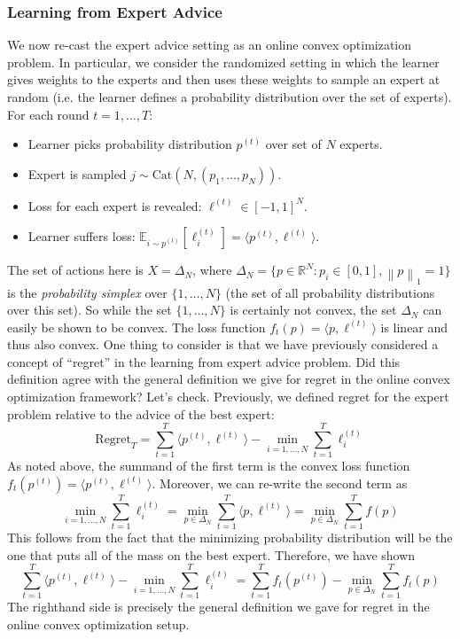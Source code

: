 \documentclass[12pt]{article}
\newcommand*{\norm}[1]{\left\lVert#1\right\rVert}
\newcommand{\E}{\mathbb{E}}
\newcommand{\R}{\mathcal{R}}
\def\R{\mathbb{R}}
\begin{document}
\subsubsection{Learning from Expert Advice}
We now re-cast the expert advice setting as an online convex optimization problem. In particular, we consider the randomized setting in which the learner gives weights to the 
experts and then uses these weights to sample an expert at random (i.e. the learner defines a probability distribution over the set of experts). 
For each round $t = 1, \dots, T$:
\begin{itemize}
\item Learner picks probability distribution $p^{(t)}$ over set of $N$ experts.
\item Expert is sampled $j \sim \text{Cat}(N, (p_1, \dots, p_N))$.
\item Loss for each expert is revealed: $\ell^{(t)} \in [-1, 1]^N$. 
\item Learner suffers loss: $\E_{i \sim p^{(t)}} [\ell^{(t)}_i] = \langle p^{(t)}, \ell^{(t)} \rangle$.
\end{itemize}
The set of actions here is $X = \Delta_N$, where $\Delta_N = \{p \in \R^N: p_i \in [0, 1], \norm{p}_1 = 1\}$ is the \textit{probability simplex} over $\{1, \dots, N\}$ (the set of all probability distributions over this set). 
So while the set $\{1, \dots, N\}$ is certainly not convex, the set $\Delta_N$ can easily be shown to be convex. The loss function $f_t(p) = \langle p, \ell^{(t)} \rangle$ is linear and thus also 
convex. One thing to consider is that we have previously considered a concept of ``regret'' in the learning from expert advice problem. Did this definition agree with the general definition we give for regret in the
online convex optimization framework? Let's check. Previously, we defined regret for the expert problem relative to the advice of the best expert: 
\[\text{Regret}_T = \sum_{t = 1}^{T} \langle p^{(t)}, \ell^{(t)} \rangle - \min_{i = 1, \dots, N} \sum_{t = 1}^{T} \ell_i^{(t)}\]
As noted above, the summand of the first term is the convex loss function $f_t(p^{(t)}) = \langle p^{(t)}, \ell^{(t)} \rangle$. Moreover, we can re-write the second term as 
\[\min_{i = 1, \dots, N} \sum_{t = 1}^{T} \ell_i^{(t)} = \min_{p \in \Delta_N} \sum_{t = 1}^{T} \langle p, \ell^{(t)}\rangle =  \min_{p \in \Delta_N} \sum_{t = 1}^{T} f(p)\]
This follows from the fact that the minimizing probability distribution will be the one that puts all of the mass on the best expert. Therefore, we have shown
\[ \sum_{t = 1}^{T} \langle p^{(t)}, \ell^{(t)} \rangle - \min_{i = 1, \dots, N} \sum_{t = 1}^{T} \ell_i^{(t)} = \sum_{t = 1}^{T} f_t(p^{(t)}) - \min_{p \in \Delta_N} \sum_{t = 1}^{T} f_t(p)\]
The righthand side is precisely the general definition we gave for regret in the online convex optimization setup. 
\end{document}
